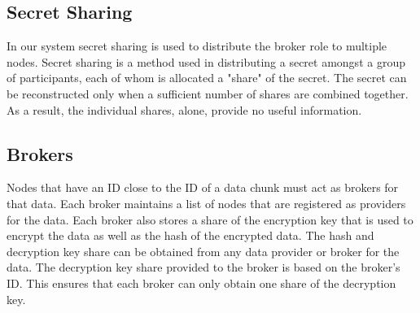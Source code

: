 \documentclass[%
				10pt,
        final,
        notitlepage,
        narroweqnarray,
        inline,
        twoside,
        ]{ieee}
\begin{document}
\subsection{Secret Sharing}
In our system secret sharing is used to distribute the broker role to multiple nodes. Secret sharing is a method used in distributing a secret amongst a group of participants, each of whom is allocated a "share" of the secret.  The secret can be reconstructed only when a sufficient number of shares are combined together.  As a result, the individual shares, alone, provide no useful information.  

\subsection{Brokers}
Nodes that have an ID close to the ID of a data chunk must act as brokers for that data. Each broker maintains a list of nodes that are registered as providers for the data.  Each broker also stores a share of the encryption key that is used to encrypt the data as well as the hash of the encrypted data. The hash and decryption key share can be obtained from any data provider or broker for the data.  The decryption key share provided to the broker is based on the broker's ID.  This ensures that each broker can only obtain one share of the decryption key.
\end{document}
